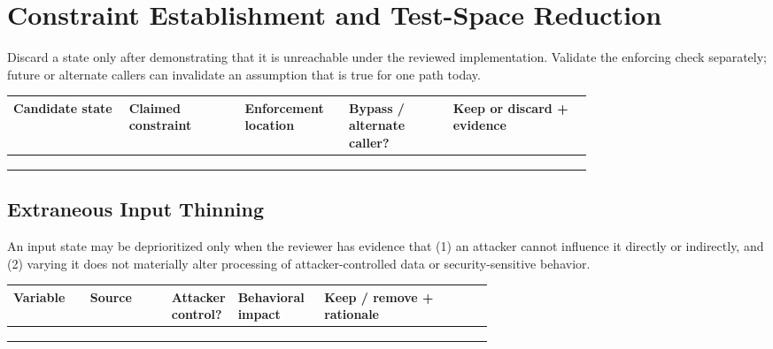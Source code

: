 \documentclass[10pt]{article}
\begin{document}
\section{Constraint Establishment and Test-Space Reduction}
Discard a state only after demonstrating that it is unreachable under the reviewed implementation. Validate the enforcing check separately; future or alternate callers can invalidate an assumption that is true for one path today.

\par\smallskip\noindent\begin{tabularx}{\linewidth}{@{}L{0.20\linewidth}L{0.20\linewidth}L{0.18\linewidth}L{0.18\linewidth}Y@{}}
\toprule
Candidate state & Claimed constraint & Enforcement location & Bypass / alternate caller? & Keep or discard + evidence \\
\midrule
\rule{0pt}{2.7em} & & & & \\
\rule{0pt}{2.7em} & & & & \\
\rule{0pt}{2.7em} & & & & \\
\bottomrule
\end{tabularx}

\subsection{Extraneous Input Thinning}
An input state may be deprioritized only when the reviewer has evidence that (1) an attacker cannot influence it directly or indirectly, and (2) varying it does not materially alter processing of attacker-controlled data or security-sensitive behavior.
\par\smallskip\noindent\begin{tabularx}{\linewidth}{@{}L{0.16\linewidth}L{0.17\linewidth}C{0.12\linewidth}L{0.18\linewidth}Y@{}}
\toprule
Variable & Source & Attacker control? & Behavioral impact & Keep / remove + rationale \\
\midrule
\rule{0pt}{2.5em} & & & & \\
\rule{0pt}{2.5em} & & & & \\
\rule{0pt}{2.5em} & & & & \\
\bottomrule
\end{tabularx}
\clearpage
\end{document}
